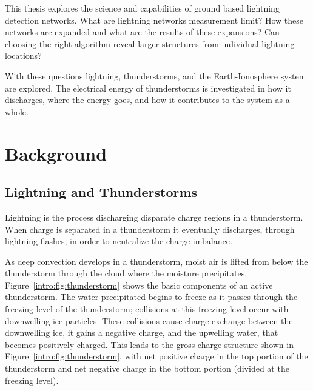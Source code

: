 This thesis explores the science and capabilities of ground based lightning detection networks.
What are lightning networks measurement limit?
How these networks are expanded and what are the results of these expansions?
Can choosing the right algorithm reveal larger structures from individual lightning locations?

With these questions lightning, thunderstorms, and the Earth-Ionosphere system are explored.
The electrical energy of thunderstorms is investigated in how it discharges, where the energy goes, and how it contributes to the system as a whole.


\section{Background}

\subsection{Lightning and Thunderstorms}

Lightning is the process discharging disparate charge regions in a thunderstorm.
When charge is separated in a thunderstorm it eventually discharges, through lightning flashes, in order to neutralize the charge imbalance.

As deep convection develops in a thunderstorm, moist air is lifted from below the thunderstorm through the cloud where the moisture precipitates.
Figure~\ref{intro:fig:thunderstorm} shows the basic components of an active thunderstorm.
The water precipitated begins to freeze as it passes through the freezing level of the thunderstorm; collisions at this freezing level occur with downwelling ice particles.
These collisions cause charge exchange between the downwelling ice, it gains a negative charge, and the upwelling water, that becomes positively charged.
This leads to the gross charge structure shown in Figure~\ref{intro:fig:thunderstorm}, with net positive charge in the top portion of the thunderstorm and net negative charge in the bottom portion (divided at the freezing level).

